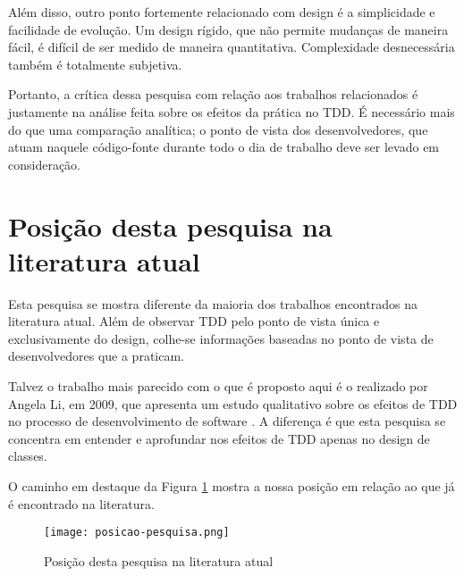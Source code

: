 Além disso, outro ponto fortemente relacionado com design é a simplicidade e
facilidade de evolução. Um design rígido, que não permite mudanças de maneira
fácil, é difícil de ser medido de maneira quantitativa. Complexidade
desnecessária também é totalmente subjetiva. 

Portanto, a crítica dessa pesquisa
com relação aos trabalhos relacionados é justamente na análise feita sobre os
efeitos da prática no TDD. É necessário mais do que uma comparação analítica; o
ponto de vista dos desenvolvedores, que atuam naquele código-fonte durante todo
o dia de trabalho deve ser levado em consideração.

\section{Posição desta pesquisa na literatura atual}

Esta pesquisa se mostra diferente da maioria dos trabalhos encontrados na
literatura atual. Além de observar TDD pelo ponto de vista única e
exclusivamente do design, colhe-se informações baseadas no ponto de
vista de desenvolvedores que a praticam.

Talvez o trabalho mais parecido com o que é proposto aqui é o
realizado por Angela Li, em 2009, que apresenta um estudo qualitativo sobre os
efeitos de TDD no processo de desenvolvimento de software \cite{angela-li}. 
A diferença é que esta pesquisa se concentra em entender e aprofundar nos
efeitos de TDD apenas no design de classes.

O caminho em destaque da Figura \ref{fig:posicao-pesquisa} mostra a nossa posição
em relação ao que já é encontrado na literatura.

\begin{figure}
  \centering
  \texttt{[image: posicao-pesquisa.png]}
  \caption{Posição desta pesquisa na literatura atual}
  \label{fig:posicao-pesquisa}
\end{figure}

